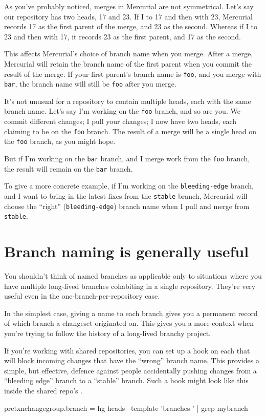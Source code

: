 As you've probably noticed, merges in Mercurial are not symmetrical.
Let's say our repository has two heads, 17 and 23.  If I
 to 17 and then  with 23, Mercurial records
17 as the first parent of the merge, and 23 as the second.  Whereas if
I  to 23 and then  with 17, it records 23
as the first parent, and 17 as the second.

This affects Mercurial's choice of branch name when you merge.  After
a merge, Mercurial will retain the branch name of the first parent
when you commit the result of the merge.  If your first parent's
branch name is \texttt{foo}, and you merge with \texttt{bar}, the
branch name will still be \texttt{foo} after you merge.

It's not unusual for a repository to contain multiple heads, each with
the same branch name.  Let's say I'm working on the \texttt{foo}
branch, and so are you.  We commit different changes; I pull your
changes; I now have two heads, each claiming to be on the \texttt{foo}
branch.  The result of a merge will be a single head on the
\texttt{foo} branch, as you might hope.

But if I'm working on the \texttt{bar} branch, and I merge work from
the \texttt{foo} branch, the result will remain on the \texttt{bar}
branch.

To give a more concrete example, if I'm working on the
\texttt{bleeding-edge} branch, and I want to bring in the latest fixes
from the \texttt{stable} branch, Mercurial will choose the ``right''
(\texttt{bleeding-edge}) branch name when I pull and merge from
\texttt{stable}.

\section{Branch naming is generally useful}

You shouldn't think of named branches as applicable only to situations
where you have multiple long-lived branches cohabiting in a single
repository.  They're very useful even in the one-branch-per-repository
case.  

In the simplest case, giving a name to each branch gives you a
permanent record of which branch a changeset originated on.  This
gives you a more context when you're trying to follow the history of a
long-lived branchy project.

If you're working with shared repositories, you can set up a
 hook on each that will block incoming changes
that have the ``wrong'' branch name.  This provides a simple, but
effective, defence against people accidentally pushing changes from a
``bleeding edge'' branch to a ``stable'' branch.  Such a hook might
look like this inside the shared repo's \hgrc.
\begin{codesample2}
  [hooks]
  pretxnchangegroup.branch = hg heads --template '{branches} ' | grep mybranch
\end{codesample2}

